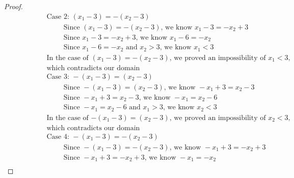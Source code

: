 \documentclass{article}
\begin{document}
\begin{enumerate}
\begin{enumerate}
\begin{proof}
\begin{align}
                &\hspace{2cm} \text{Case 2: } (x_1 - 3) = - (x_2 - 3) \\
                &\hspace{3cm} \text{Since } (x_1 - 3) = - (x_2 - 3) \text{, we know } x_1 - 3 = - x_2 + 3 \\
                &\hspace{3cm} \text{Since } x_1 - 3 = - x_2 + 3 \text{, we know } x_1 - 6 = - x_2 \\
                &\hspace{3cm} \text{Since } x_1 - 6 = - x_2 \text{ and $x_2 > 3$, we know } x_1 < 3 \\
                &\hspace{2cm} \text{In the case of $(x_1 - 3) = - (x_2 - 3)$, we proved an impossibility of $x_1 < 3$,} \\
                &\hspace{2cm} \text{which contradicts our domain} \nonumber \\
                &\hspace{2cm} \text{Case 3: } - (x_1 - 3) = (x_2 - 3) \\
                &\hspace{3cm} \text{Since } - (x_1 - 3) = (x_2 - 3) \text{, we know } - x_1 + 3 = x_2 - 3 \\
                &\hspace{3cm} \text{Since } - x_1 + 3 = x_2 - 3 \text{, we know } - x_1 = x_2 - 6 \\
                &\hspace{3cm} \text{Since } - x_1 = x_2 - 6 \text{ and $x_1 > 3$, we know } x_2 < 3 \\
                &\hspace{2cm} \text{In the case of $- (x_1 - 3) = (x_2 - 3)$, we proved an impossibility of $x_2 < 3$,} \\
                &\hspace{2cm} \text{which contradicts our domain} \nonumber \\
                &\hspace{2cm} \text{Case 4: } - (x_1 - 3) = - (x_2 - 3) \\
                &\hspace{3cm} \text{Since } - (x_1 - 3) = - (x_2 - 3) \text{, we know } - x_1 + 3 = - x_2 + 3 \\
                &\hspace{3cm} \text{Since } - x_1 + 3 = - x_2 + 3 \text{, we know } - x_1 = - x_2 \\

\end{align}
\end{proof}
\end{enumerate}
\end{enumerate}
\end{document}
